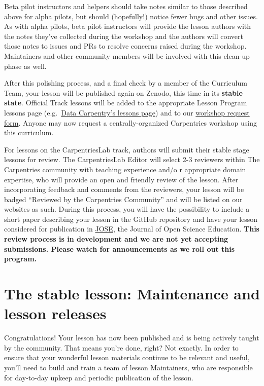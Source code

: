 \documentclass[
]{book}
\begin{document}
Beta pilot instructors and helpers should take notes similar
to those described above for alpha pilots, but should (hopefully!)
notice fewer bugs and other issues. As with alpha pilots,
beta pilot instructors will provide the lesson authors with
the notes they've collected during the workshop and the authors
will convert those notes to issues and PRs to resolve concerns
raised during the workshop. Maintainers and other community members
will be involved with this clean-up phase as well.

After this polishing process, and a final check by a member of the
Curriculum Team, your lesson will be published again on Zenodo,
this time in its \textbf{stable state}. Official Track lessons will be added to
the appropriate Lesson Program lessons page (e.g.~\href{https://datacarpentry.org/lessons/}{Data Carpentry's lessons page})
and to our \href{http://carpentries.org/request-workshop}{workshop request form}. Anyone may now request a centrally-organized
Carpentries workshop using this curriculum.

For lessons on the CarpentriesLab track, authors will submit their stable stage lessons for review.
The CarpentriesLab Editor will select 2-3 reviewers within The Carpentries community with teaching experience and/o
r appropriate domain expertise, who will provide an open and friendly review of the lesson.
After incorporating feedback and comments from the reviewers, your lesson will be badged
``Reviewed by the Carpentries Community'' and will be listed on our websites as such. During this process,
you will have the possibility to include a short paper describing your
lesson in the GitHub repository and have your lesson considered for publication in
\href{http://jose.theoj.org/}{JOSE}, the Journal of Open Science Education.
\textbf{This review process is in development and we are not yet accepting submissions. Please watch for
announcements as we roll out this program.}

\hypertarget{the-stable-lesson-maintenance-and-lesson-releases}{%
\section{The stable lesson: Maintenance and lesson releases}\label{the-stable-lesson-maintenance-and-lesson-releases}}

Congratulations! Your lesson has now been published and is being actively taught by the community.
That means you're done, right? Not exactly. In order to ensure that your wonderful lesson materials
continue to be relevant and useful, you'll need to build and train a team of lesson Maintainers, who
are responsible for day-to-day upkeep and periodic publication of the lesson.
\end{document}
